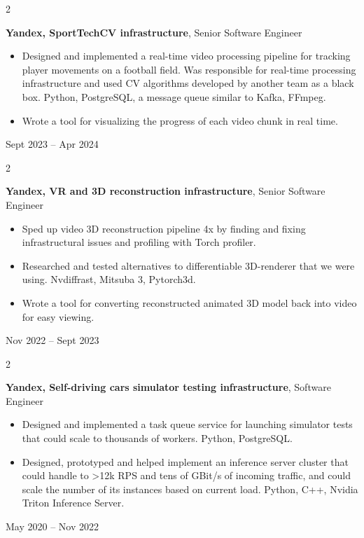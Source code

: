 \documentclass[11pt, letterpaper]{article}
\newenvironment{highlights}{
    \begin{itemize}[
        topsep=0.10 cm,
        parsep=0.10 cm,
        partopsep=0pt,
        itemsep=0pt,
        leftmargin=0.4 cm + 10pt
    ]
}{
    \end{itemize}
} %
\newenvironment{twocolentry}[2][]{
    \onecolentry
    \def\secondColumn{#2}
    \setcolumnwidth{\fill, 4.5 cm}
    \begin{paracol}{2}
}{
    \switchcolumn \raggedleft \secondColumn
    \end{paracol}
    \endonecolentry
} %
\begin{document}
        \begin{twocolentry}{
            Sept 2023 – Apr 2024
        }
            \textbf{Yandex, SportTechCV infrastructure}, Senior Software Engineer
            \begin{highlights}
                \item Designed and implemented a real-time video processing pipeline for tracking player movements on a football field. Was responsible for real-time processing infrastructure and used CV algorithms developed by another team as a black box. Python, PostgreSQL, a message queue similar to Kafka, FFmpeg.
                \item Wrote a tool for visualizing the progress of each video chunk in real time.
            \end{highlights}
        \end{twocolentry}


        \vspace{0.2 cm}

        \begin{twocolentry}{
            Nov 2022 – Sept 2023
        }
            \textbf{Yandex, VR and 3D reconstruction infrastructure}, Senior Software Engineer
            \begin{highlights}
                \item Sped up video 3D reconstruction pipeline 4x by finding and fixing infrastructural issues and profiling with Torch profiler.
                \item Researched and tested alternatives to differentiable 3D-renderer that we were using. Nvdiffrast, Mitsuba 3, Pytorch3d.
                \item Wrote a tool for converting reconstructed animated 3D model back into video for easy viewing.
            \end{highlights}
        \end{twocolentry}


        \vspace{0.2 cm}

        \begin{twocolentry}{
            May 2020 – Nov 2022
        }
            \textbf{Yandex, Self-driving cars simulator testing infrastructure}, Software Engineer
            \begin{highlights}
                \item Designed and implemented a task queue service for launching simulator tests that could scale to thousands of workers. Python, PostgreSQL.
                \item Designed, prototyped and helped implement an inference server cluster that could handle to >12k RPS and tens of GBit/s of incoming traffic, and could scale the number of its instances based on current load. Python, C++, Nvidia Triton Inference Server.
            \end{highlights}
        \end{twocolentry}
\end{document}
